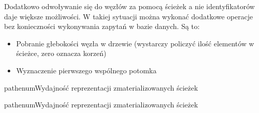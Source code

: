 Dodatkowo odwoływanie się do węzłów za pomocą ścieżek a nie identyfikatorów daje większe możliwości.
W takiej sytuacji można wykonać dodatkowe operacje bez konieczności wykonywania zapytań w bazie danych.
Są to:
\begin{itemize}
    \item
        Pobranie głebokości węzła w drzewie (wystarczy policzyć ilość elementów w ścieżce, zero oznacza korzeń)
    \item
        Wyznaczenie pierwszego wspólnego potomka
\end{itemize}


\begin{qxtab}{pathenum}{Wydajność reprezentacji zmaterializowanych ścieżek}
\end{qxtab}

\begin{qxfig}{pathenum}{Wydajność reprezentacji zmaterializowanych ścieżek}
\end{qxfig}


